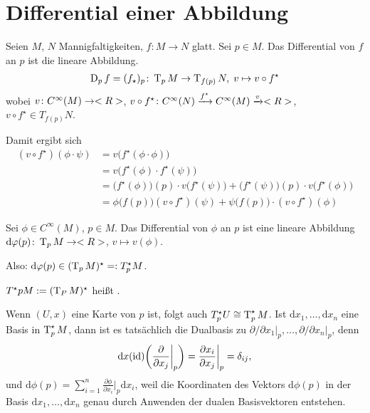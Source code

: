 \section{Differential einer Abbildung}
\begin{definition}
	Seien $M$, $N$ Mannigfaltigkeiten, $f\colon M\to N$ glatt. Sei $p\in M$. Das Differential von $f$ an $p$ ist die lineare Abbildung.\begin{align*}
		\operatorname{D}_p f = (f_\star)_p\colon \operatorname{T}_p M\to \operatorname{T}_{f(p)} N,\; v\mapsto v\circ f^\star
	\end{align*}
	wobei $v\colon C^\infty(M)\to <R>$, $v\circ f^\star\colon C^\infty(N)\xrightarrow{f^\star} C^\infty(M)\xrightarrow v <R>$, $v\circ f^\star\in T_{f(p)} N$.
\end{definition}

Damit ergibt sich \begin{align*}
	(v\circ f^\star)(\phi\cdot\psi) &= v\big(f^\star(\phi\cdot\phi)\big)\\
	&= v\big(f^\star(\phi)\cdot f^\star(\psi)\big)\\
	&= \big(f^\star(\phi)\big)(p)\cdot v\big( f^\star(\psi)\big) + \big(f^\star(\psi)\big)(p)\cdot v\big(f^\star(\phi)\big)\\
	&= \phi\big(f(p)\big)(v\circ f^\star)(\psi) + \psi\big(f(p)\big)\cdot (v\circ f^\star)(\phi)
\end{align*}

\begin{definition}
	Sei $\phi\in C^\infty(M)$, $p\in M$. Das Differential von $\phi$ an $p$ ist eine lineare Abbildung $\mathrm d\varphi(p)\colon \operatorname{T}_p M\to <R>$, $v\mapsto v(\phi)$.
	
	Also: $\mathrm d\varphi(p)\in (\operatorname{T}_p M)^\star =: T^\star_p M$.
\end{definition}

\begin{definition}
	$T^\star p M := (\operatorname{T}_P M)^\star$ heißt .
\end{definition}

Wenn $(U,x)$ eine Karte von $p$ ist, folgt auch $T^\star_p U\cong \operatorname{T}_p^\star M$. Ist $\mathrm dx_1,\dots,\mathrm dx_n$ eine Basis in $\operatorname{T}_p^\star M$, dann ist es tatsächlich die Dualbasis zu $\partial\slash\partial x_1\big|_p,\dots,\partial\slash\partial x_n\big|_p$, denn \begin{align*}
	\mathrm dx(\operatorname{id})\bigg(\frac{\partial}{\partial x_j}\bigg|_p\bigg) = \frac{\partial x_i}{\partial x_j}\bigg|_p = \delta_{ij},
\end{align*}
und $\mathrm d\phi(p) = \sum_{i=1}^n \frac{\partial \phi}{\partial x_i}\Big|_p \mathrm dx_i$, weil die Koordinaten des Vektors $\mathrm d\phi(p)$ in der Basis $\mathrm dx_1,\dots,\mathrm dx_n$ genau durch Anwenden der dualen Basisvektoren entstehen.